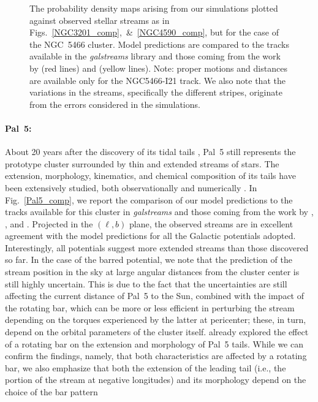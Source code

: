 \begin{figure}
                \caption[]{The probability density maps arising from our simulations plotted against observed stellar streams as in Figs.~\ref{NGC3201_comp},~\&~\ref{NGC4590_comp}, but for the case of the NGC~5466 cluster. Model predictions are compared to the tracks available in the \textit{galstreams} library and those coming from the work by  \citet{2006ApJ...639L..17G} (red lines) and \citet{2021ApJ...914..123I} (yellow lines). Note: proper motions and distances are available only for the NGC5466-I21 track. We also note that the variations in the streams, specifically the different stripes, originate from the errors considered in the simulations.\label{NGC5466_comp}}
            \end{figure}  
            \onecolumn          
            
            \paragraph{Pal~5: } About 20 years after the discovery of its tidal tails \citep{2001ApJ...548L.165O, 2003AJ....126.2385O}, Pal~5 still represents the prototype cluster surrounded by thin and extended streams of stars. The extension, morphology, kinematics, and chemical composition of its tails have been extensively studied, both observationally and numerically \citep{2003AJ....126.2385O, 2002AJ....124..349R, 2004AJ....127.2753D, 2004AJ....128.2274K, 2006ApJ...641L..37G, 2009AJ....137.3378O, 2012A&A...546L...7M, 2015ApJ...803...80K, 2015MNRAS.446.3297K, 2015ApJ...811..123F, 2016ApJ...819....1I, 2016ApJ...823..157I, 2016MNRAS.460.2711T, 2017A&A...601A..41K, 2017ApJ...842..120I, 2017NatAs...1..633P, 2019AJ....158..223P, 2020MNRAS.493.4978S, 2020ApJ...889...70B, 2021ApJ...914..123I, 2022MNRAS.510.3727P, 2015MNRAS.446.3297K}. In Fig.~\ref{Pal5_comp}, we report the comparison of our model predictions to the tracks available for this cluster in \textit{galstreams} and  those coming from the work by \citet{2019AJ....158..223P}, \citet{2020MNRAS.493.4978S}, and \citet{2021ApJ...914..123I}. Projected in the $(\ell, b)$ plane, the observed streams are in excellent agreement with the model predictions for all the Galactic potentials adopted. Interestingly, all potentials suggest more extended streams than those discovered so far. In the case of the barred potential, we note that the prediction of the stream position in the sky at large angular distances from the cluster center is still highly uncertain. This is due to the fact that the uncertainties are still affecting the current distance of Pal~5 to the Sun, combined with the impact of the rotating bar, which can be more or less efficient in perturbing the stream depending on the torques experienced by the latter at pericenter; these, in turn, depend on the orbital parameters of the cluster itself. \citet{2017NatAs...1..633P} already explored the effect of a rotating bar on the extension and morphology of Pal~5 tails. While we can confirm the \citet{2017NatAs...1..633P} findings, namely, that both characteristics are affected by a rotating bar, we also emphasize that both the extension of the leading tail (i.e., the portion of the stream at negative longitudes) and its morphology depend on the choice of the bar pattern 